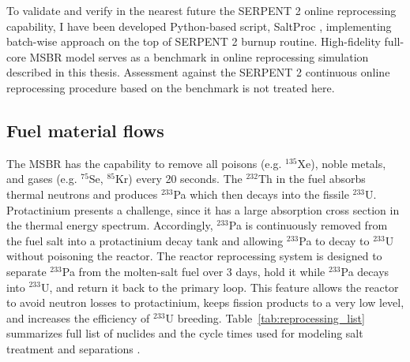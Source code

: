 To validate and verify in the nearest future the SERPENT 2 online reprocessing capability, I have been developed Python-based script, SaltProc \cite{andrei_rykhlevskii_arfc/saltproc:_2018}, implementing batch-wise approach on the top of SERPENT 2 burnup routine. High-fidelity full-core \gls{MSBR} model serves as a benchmark in online reprocessing simulation described in this thesis. Assessment against the SERPENT 2 continuous online reprocessing procedure based on the benchmark is not treated here.

\subsection{Fuel material flows}

The \gls{MSBR} has the capability to remove all poisons (e.g. $^{135}$Xe), noble metals, and gases (e.g. $^{75}$Se, $^{85}$Kr) every 20 seconds. The $^{232}$Th in the fuel absorbs thermal neutrons and produces $^{233}$Pa which then decays into the fissile $^{233}$U. Protactinium presents a challenge, since it has a large absorption cross section in the thermal energy spectrum. Accordingly, $^{233}$Pa is continuously removed from the fuel salt into a protactinium decay tank and allowing $^{233}$Pa to decay to $^{233}$U without poisoning the reactor. The reactor reprocessing system is designed to separate $^{233}$Pa from the molten-salt fuel over 3 days, hold it while $^{233}$Pa decays into $^{233}$U, and return it back to the primary loop. This feature allows the reactor to avoid neutron losses to protactinium, keeps fission products to a very low level, and 
increases the efficiency of $^{233}$U breeding. Table~\ref{tab:reprocessing_list} summarizes full list of nuclides and the cycle times used for modeling salt treatment and separations \cite{robertson_conceptual_1971}. 

